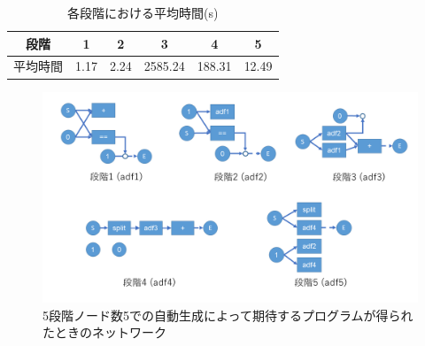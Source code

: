 \documentclass[exploratorypaper]{jsaiart} %
\begin{document}
\begin{table}[t]
\caption{各段階における平均時間(s)}
\label{tbl:result4}
\begin{tabular}{c|ccccc}
    段階&	1&	2&	3&	4&	5\\
    \hline
    平均時間&	1.17&	2.24&	2585.24&	188.31&	12.49\\
\end{tabular}
\end{table}



\begin{figure}[t]
    \begin{center}
        \includegraphics[width=150mm]{out_net_p5n5.png}
    \end{center}
    \capwidth=90mm %
    \caption{5段階ノード数5での自動生成によって期待するプログラムが得られたときのネットワーク}
    \label{fig:out_net_p5n5}
\end{figure}
\end{document}
